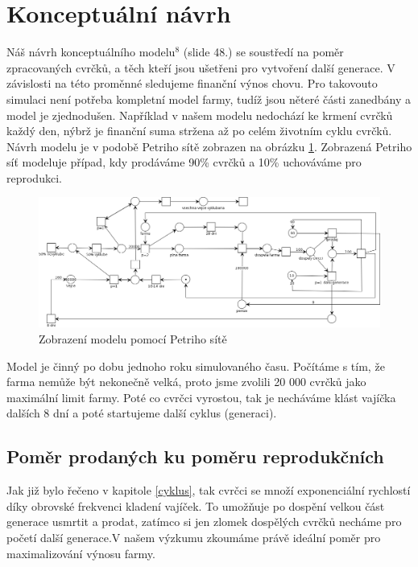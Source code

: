 \documentclass[a4paper, 12pt]{extarticle}
\begin{document}
\section{Konceptuální návrh}
Náš návrh konceptuálního modelu$^{8}$ (slide 48.) se soustředí na  poměr zpracovaných cvrčků, a těch kteří jsou ušetřeni pro vytvoření další generace. V závislosti na této proměnné sledujeme finanční výnos chovu. Pro takovouto simulaci není potřeba kompletní model farmy, tudíž jsou něteré části zanedbány a model je zjednodušen. Například v našem modelu nedochází ke krmení cvrčků každý den, nýbrž je finanční suma stržena až po celém životním cyklu cvrčků. Návrh modelu je v podobě Petriho sítě zobrazen na obrázku \ref{petrinet}. Zobrazená Petriho síť modeluje případ, kdy prodáváme 90\% cvrčků a 10\% uchováváme pro reprodukci.\\

\begin{figure}[h]
\includegraphics[width=\linewidth]{IMS2.png}
\caption{Zobrazení modelu pomocí Petriho sítě} \label{petrinet}
\end{figure}

Model je činný po dobu jednoho roku simulovaného času. Počítáme s tím, že farma nemůže být nekonečně velká, proto jsme zvolili 20 000 cvrčků jako maximální limit farmy. Poté co cvrčci vyrostou, tak je necháváme klást vajíčka dalších 8 dní a poté startujeme další cyklus (generaci).

\newpage

\subsection{Poměr prodaných ku poměru reprodukčních} 
Jak již bylo řečeno v kapitole \ref{cyklus}, tak cvrčci se množí exponenciální rychlostí díky obrovské frekvenci kladení vajíček. To umožňuje po dospění velkou část generace usmrtit a prodat, zatímco si jen zlomek dospělých cvrčků necháme pro početí další generace.V našem výzkumu zkoumáme právě ideální poměr pro maximalizování výnosu farmy. 
\end{document}
